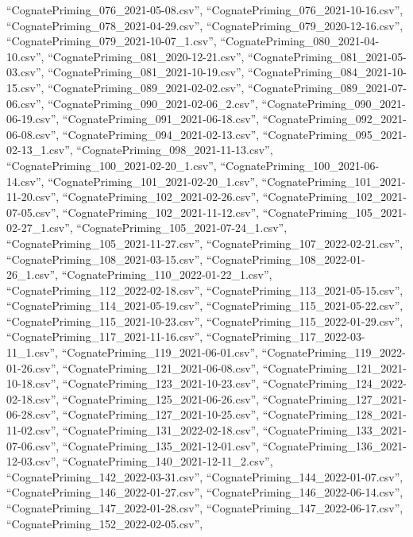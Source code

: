 \documentclass[
  letterpaper,
  DIV=11,
  numbers=noendperiod]{scrartcl}
\begin{document}
``CognatePriming\_076\_2021-05-08.csv'',
``CognatePriming\_076\_2021-10-16.csv'',
``CognatePriming\_078\_2021-04-29.csv'',
``CognatePriming\_079\_2020-12-16.csv'',
``CognatePriming\_079\_2021-10-07\_1.csv'',
``CognatePriming\_080\_2021-04-10.csv'',
``CognatePriming\_081\_2020-12-21.csv'',
``CognatePriming\_081\_2021-05-03.csv'',
``CognatePriming\_081\_2021-10-19.csv'',
``CognatePriming\_084\_2021-10-15.csv'',
``CognatePriming\_089\_2021-02-02.csv'',
``CognatePriming\_089\_2021-07-06.csv'',
``CognatePriming\_090\_2021-02-06\_2.csv'',
``CognatePriming\_090\_2021-06-19.csv'',
``CognatePriming\_091\_2021-06-18.csv'',
``CognatePriming\_092\_2021-06-08.csv'',
``CognatePriming\_094\_2021-02-13.csv'',
``CognatePriming\_095\_2021-02-13\_1.csv'',
``CognatePriming\_098\_2021-11-13.csv'',
``CognatePriming\_100\_2021-02-20\_1.csv'',
``CognatePriming\_100\_2021-06-14.csv'',
``CognatePriming\_101\_2021-02-20\_1.csv'',
``CognatePriming\_101\_2021-11-20.csv'',
``CognatePriming\_102\_2021-02-26.csv'',
``CognatePriming\_102\_2021-07-05.csv'',
``CognatePriming\_102\_2021-11-12.csv'',
``CognatePriming\_105\_2021-02-27\_1.csv'',
``CognatePriming\_105\_2021-07-24\_1.csv'',
``CognatePriming\_105\_2021-11-27.csv'',
``CognatePriming\_107\_2022-02-21.csv'',
``CognatePriming\_108\_2021-03-15.csv'',
``CognatePriming\_108\_2022-01-26\_1.csv'',
``CognatePriming\_110\_2022-01-22\_1.csv'',
``CognatePriming\_112\_2022-02-18.csv'',
``CognatePriming\_113\_2021-05-15.csv'',
``CognatePriming\_114\_2021-05-19.csv'',
``CognatePriming\_115\_2021-05-22.csv'',
``CognatePriming\_115\_2021-10-23.csv'',
``CognatePriming\_115\_2022-01-29.csv'',
``CognatePriming\_117\_2021-11-16.csv'',
``CognatePriming\_117\_2022-03-11\_1.csv'',
``CognatePriming\_119\_2021-06-01.csv'',
``CognatePriming\_119\_2022-01-26.csv'',
``CognatePriming\_121\_2021-06-08.csv'',
``CognatePriming\_121\_2021-10-18.csv'',
``CognatePriming\_123\_2021-10-23.csv'',
``CognatePriming\_124\_2022-02-18.csv'',
``CognatePriming\_125\_2021-06-26.csv'',
``CognatePriming\_127\_2021-06-28.csv'',
``CognatePriming\_127\_2021-10-25.csv'',
``CognatePriming\_128\_2021-11-02.csv'',
``CognatePriming\_131\_2022-02-18.csv'',
``CognatePriming\_133\_2021-07-06.csv'',
``CognatePriming\_135\_2021-12-01.csv'',
``CognatePriming\_136\_2021-12-03.csv'',
``CognatePriming\_140\_2021-12-11\_2.csv'',
``CognatePriming\_142\_2022-03-31.csv'',
``CognatePriming\_144\_2022-01-07.csv'',
``CognatePriming\_146\_2022-01-27.csv'',
``CognatePriming\_146\_2022-06-14.csv'',
``CognatePriming\_147\_2022-01-28.csv'',
``CognatePriming\_147\_2022-06-17.csv'',
``CognatePriming\_152\_2022-02-05.csv'',
\end{document}
